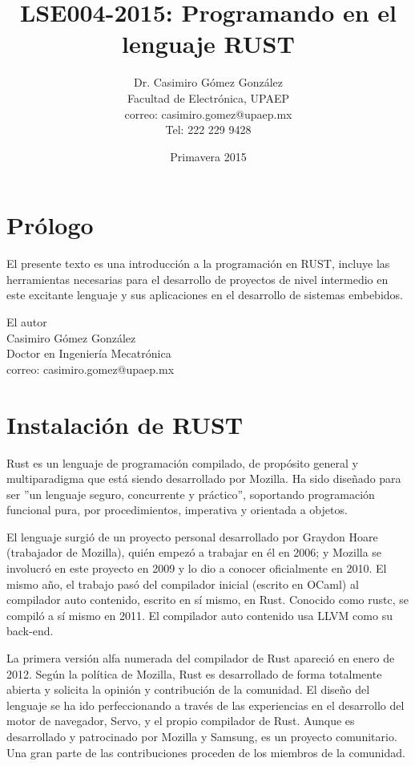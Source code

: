 \documentclass[12pt, twoside]{report}
\title{LSE004-2015: Programando en el lenguaje RUST}
\author{Dr. Casimiro Gómez González\\
	Facultad de Electrónica, UPAEP\\
               correo: casimiro.gomez@upaep.mx\\
               Tel: 222 229 9428}
\date{Primavera 2015}
\begin{document}
\maketitle

\chapter*{Prólogo}

El presente texto es una introducción a la programación en RUST, incluye las herramientas necesarias para el desarrollo de proyectos de nivel intermedio en este excitante lenguaje y sus aplicaciones en el desarrollo de sistemas embebidos.

\begin{flushright}
	
	El autor\\
	Casimiro Gómez González\\
	Doctor en Ingeniería Mecatrónica \\
	correo: casimiro.gomez@upaep.mx
\end{flushright}

\tableofcontents

\chapter{Instalación de RUST}
Rust es un lenguaje de programación compilado, de propósito general y multiparadigma que está siendo desarrollado por Mozilla. Ha sido diseñado para ser ''un lenguaje seguro, concurrente y práctico'', soportando programación funcional pura, por procedimientos, imperativa y orientada a objetos.

El lenguaje surgió de un proyecto personal desarrollado por Graydon Hoare (trabajador de Mozilla), quién empezó a trabajar en él en 2006; y Mozilla se involucró en este proyecto en 2009 y lo dio a conocer oficialmente en 2010. El mismo año, el trabajo pasó del compilador inicial (escrito en OCaml) al compilador auto contenido, escrito en sí mismo, en Rust. Conocido como rustc, se compiló a sí mismo en 2011. El compilador auto contenido usa LLVM como su back-end.

La primera versión alfa numerada del compilador de Rust apareció en enero de 2012. Según la política de Mozilla, Rust es desarrollado de forma totalmente abierta y solicita la opinión y contribución de la comunidad. El diseño del lenguaje se ha ido perfeccionando a través de las experiencias en el desarrollo del motor de navegador, Servo, y el propio compilador de Rust. Aunque es desarrollado y patrocinado por Mozilla y Samsung, es un proyecto comunitario. Una gran parte de las contribuciones proceden de los miembros de la comunidad.
\end{document}

